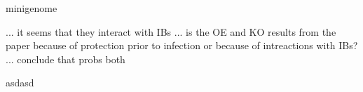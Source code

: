 minigenome \cite{Teng2016UseTranscription}

... it seems that they interact with IBs ... is the OE and KO results from the paper because of protection prior to infection or because of intreactions with IBs? ... conclude that probs both

asdasd






